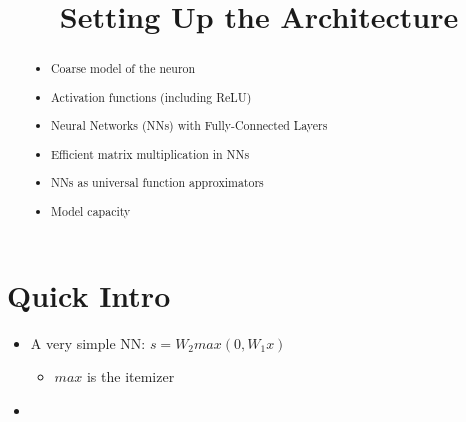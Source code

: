 \documentclass[]{article}
\title{Setting Up the Architecture}
\author{}
\begin{document}
\maketitle

\begin{abstract}

\begin{itemize}
	
	\item Coarse model of the neuron
	\item Activation functions (including ReLU)
	\item Neural Networks (NNs) with Fully-Connected Layers
	\item Efficient matrix multiplication in NNs
	\item NNs as universal function approximators
	\item Model capacity
\end{itemize}

\end{abstract}

\section{Quick Intro}

\begin{itemize}
	\item A very simple NN: \begin{math}s = W_2 max(0, W_1x)\end{math}
	\begin{itemize}
		\item \begin{math}
		max
		\end{math} is the itemizer
	\end{itemize}
	\item 
\end{itemize}
\end{document}

